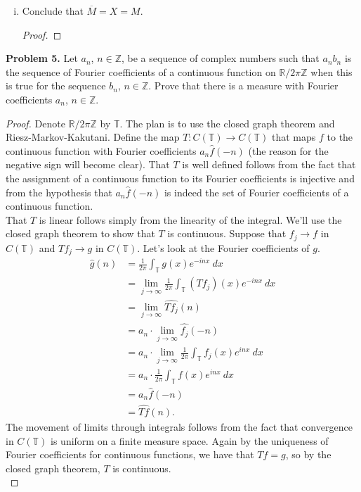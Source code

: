 \documentclass[11pt,letterpaper]{report}
\newcommand{\integers}{\mathbb{Z}}
\newcommand{\reals}{\mathbb{R}}
\newcommand{\torus}{\mathbb{T}}
\begin{document}
\begin{enumerate}[(i)]
	\item Conclude that $\overline{M} = X = M$.
	\begin{proof}
		
	\end{proof}
\end{enumerate}

\noindent\textbf{Problem 5. }
Let $a_n$, $n\in \integers$, be a sequence of complex numbers such that $a_nb_n$ is the sequence of Fourier coefficients of a continuous function on $\reals/2\pi\integers$ when this is true for the sequence $b_n$, $n\in \integers$. Prove that there is a measure with Fourier coefficients $a_n$, $n\in \integers$.
\begin{proof}
	Denote $\reals/2\pi \integers$ by $\torus$. The plan is to use the closed graph theorem and Riesz-Markov-Kakutani. Define the map $T: C(\torus)\to C(\torus)$ that maps $f$ to the continuous function with Fourier coefficients $a_n\widehat{f}(-n)$ (the reason for the negative sign will become clear). That $T$ is well defined follows from the fact that the assignment of a continuous function to its Fourier coefficients is injective and from the hypothesis that $a_n\widehat{f}(-n)$ is indeed the set of Fourier coefficients of a continuous function.\\

	\noindent That $T$ is linear follows simply from the linearity of the integral. We'll use the closed graph theorem to show that $T$ is continuous. Suppose that $f_j\to f$ in $C(\torus)$ and $Tf_j\to g$ in $C(\torus)$. Let's look at the Fourier coefficients of $g$.
	\begin{align*}
		\widehat{g}(n) &= \frac{1}{2\pi}\int_\torus g(x)e^{-inx}\ dx\\
		&= \lim_{j\to \infty}\frac{1}{2\pi}\int_\torus (Tf_j)(x)e^{-inx}\ dx\\
		&= \lim_{j\to \infty}\widehat{Tf_j}(n)\\
		&= a_n\cdot \lim_{j\to \infty}\widehat{f_j}(-n)\\
		&= a_n\cdot \lim_{j\to \infty}\frac{1}{2\pi}\int_\torus f_j(x)e^{inx}\ dx\\
		&= a_n\cdot \frac{1}{2\pi}\int_\torus f(x)e^{inx}\ dx\\
		&= a_n\widehat{f}(-n)\\
		&= \widehat{Tf}(n).
	\end{align*}
	The movement of limits through integrals follows from the fact that convergence in $C(\torus)$ is uniform on a finite measure space. Again by the uniqueness of Fourier coefficients for continuous functions, we have that $Tf = g$, so by the closed graph theorem, $T$ is continuous.\\


\end{proof}
\end{document}

